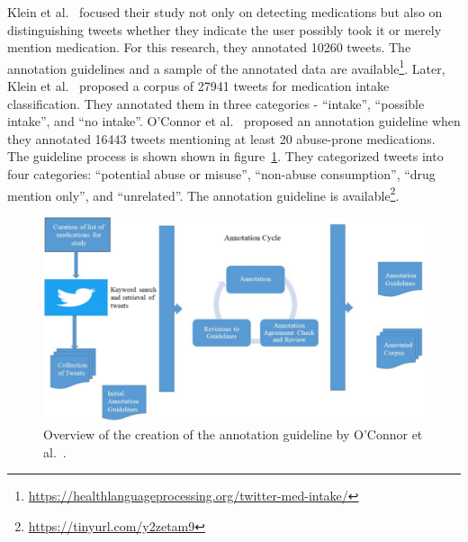 Klein et al.~\cite{klein2017detecting} focused their study not only on detecting medications but also on distinguishing tweets whether they indicate the user possibly took it or merely mention medication. For this research, they annotated 10260 tweets. The annotation guidelines and a sample of the annotated data are available\footnote{\url{https://healthlanguageprocessing.org/twitter-med-intake/}}. Later, Klein et al.~\cite{klein2019analysis} proposed a corpus of 27941 tweets for medication intake classification. They annotated them in three categories - “intake”, “possible intake”, and “no intake”. O’Connor et al.~\cite{o2020promoting} proposed an annotation guideline when they annotated 16443 tweets mentioning at least 20 abuse-prone medications. The guideline process is shown shown in figure~\ref{fig:annotation-oconnor}. They categorized tweets into four categories: “potential abuse or misuse”, “non-abuse consumption”, “drug mention only”, and “unrelated”. The annotation guideline is available\footnote{\url{https://tinyurl.com/y2zetam9}}.

\begin{figure}[h]
	\centering
	\includegraphics[width=0.99\linewidth]{Figures/d.png}
	\caption{Overview of the creation of the annotation guideline by O’Connor et al.~\cite{o2020promoting}.}
	\label{fig:annotation-oconnor}
\end{figure}
